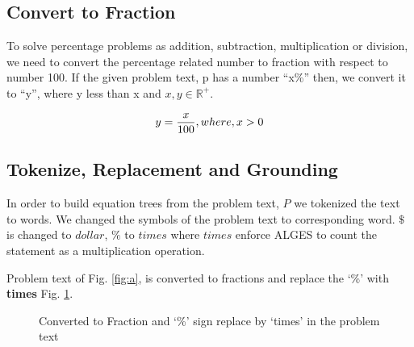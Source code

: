 \documentclass[document.tex]{subfiles}
\begin{document}
\subsection{Convert to Fraction}
\noindent To solve percentage problems as addition, subtraction, multiplication or division, we need to convert the percentage related number to fraction with respect to number 100. If the given problem text, p has a number “x\%” then, we convert it to “y”, where y less than x and $x, y \in \mathbb{R^+}$.

\begin{equation}
	y = {x \over 100}, where, x>0
	\label{eq:conv}
\end{equation}

\subsection{Tokenize, Replacement and Grounding}
\noindent In order to build equation trees from the problem text, $P$ we tokenized the text to words. We changed the symbols of the problem text to corresponding word. $\$$ is changed to $dollar$, $\%$ to $times$ where $times$ enforce ALGES to count the statement as a multiplication operation.

Problem text of Fig. \ref{fig:a}, is converted to fractions and replace the ‘\%’ with \textbf{times} Fig. \ref{fig:conv}.
\begin{figure}[H]
	
	\caption{Converted to Fraction and ‘\%’ sign replace by ‘times’ in the problem text}
	\label{fig:conv}
\end{figure}
\end{document}
